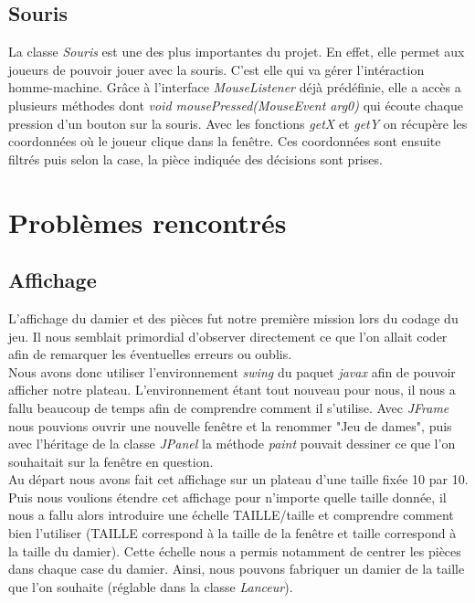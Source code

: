 \documentclass[12,french]{report}
\begin{document}
\section{Souris}

La classe \textit{Souris} est une des plus importantes du projet. En effet, elle permet aux joueurs de pouvoir jouer avec la souris. C'est elle qui va gérer l'intéraction homme-machine. Grâce à l'interface \textit{MouseListener} déjà prédéfinie, elle a accès a plusieurs méthodes dont \textit{void mousePressed(MouseEvent arg0)} qui écoute chaque pression d'un bouton sur la souris. Avec les fonctions \textit{getX} et \textit{getY} on récupère les coordonnées où le joueur clique dans la fenêtre. Ces coordonnées sont ensuite filtrés puis selon la case, la pièce indiquée des décisions sont prises.

\chapter{Problèmes rencontrés}

\section{Affichage}

L'affichage du damier et des pièces fut notre première mission lors du codage du jeu.
Il nous semblait primordial d'observer directement ce que l'on allait coder afin de remarquer les éventuelles erreurs ou oublis.\\

Nous avons donc utiliser l'environnement \textit{swing} du paquet \textit{javax} afin de pouvoir afficher notre plateau. L'environnement étant tout nouveau pour nous, il nous a fallu beaucoup de temps afin de comprendre comment il s'utilise. Avec \textit{JFrame} nous pouvions ouvrir une nouvelle fenêtre et la renommer "Jeu de dames", puis avec l'héritage de la classe \textit{JPanel} la méthode \textit{paint} pouvait dessiner ce que l'on souhaitait sur la fenêtre en question.\\

Au départ nous avons fait cet affichage sur un plateau d'une taille fixée 10 par 10. Puis nous voulions étendre cet affichage pour n'importe quelle taille donnée, il nous a fallu alors introduire une échelle TAILLE/taille et comprendre comment bien l'utiliser (TAILLE correspond à la taille de la fenêtre et taille correspond à la taille du damier). Cette échelle nous a permis notamment de centrer les pièces dans chaque case du damier. Ainsi, nous pouvons fabriquer un damier de la taille que l'on souhaite (réglable dans la classe \textit{Lanceur}).\\
\end{document}
